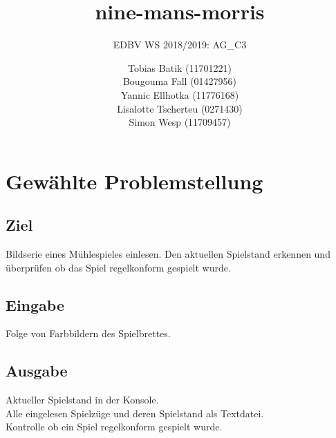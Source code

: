 \documentclass[paper=A4, deutsch]{scrartcl}
\begin{document}

\title{nine-mans-morris} %

\subtitle{EDBV WS 2018/2019: AG\_C3} %


\author{Tobias Batik (11701221)\\
Bougouma Fall (01427956)\\
Yannic Ellhotka (11776168)\\
Lisalotte Tscherteu (0271430)\\
Simon Wesp (11709457)
}




\maketitle


\section{Gewählte Problemstellung}

\subsection{Ziel}
Bildserie eines Mühlespieles einlesen. Den aktuellen Spielstand erkennen und überprüfen ob das Spiel regelkonform gespielt wurde.  
\subsection{Eingabe}
Folge von Farbbildern des Spielbrettes. 


\subsection{Ausgabe}
Aktueller Spielstand in der Konsole. \\
Alle eingelesen Spielzüge und deren Spielstand als Textdatei. \\
Kontrolle ob ein Spiel regelkonform gespielt wurde. 
\end{document}
